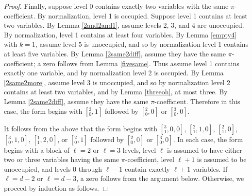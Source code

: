 \documentclass[12pt]{amsart}
\begin{document}
\begin{proof}

Finally, suppose level 0 contains exactly two variables with the same $\pi$-coefficient.  By normalization, level 1 is occupied. Suppose level 1 contains at least two variables.  By Lemma \ref{2and2and1}, assume levels 2, 3, and 4 are unoccupied.
By normalization, level 1 contains at least four variables.  By Lemma \ref{empty4} with $k=1$, assume level 5 is unoccupied, and so by normalization level 1 contains at least five variables.  By Lemma \ref{2same2diff}, assume they have the same $\pi$-coefficient; a zero follows from Lemma \ref{fivesame}. Thus assume level 1 contains exactly one variable, and by normalization level 2 is occupied.  By Lemma \ref{2same2more}, assume level 3 is unoccupied, and so by normalization level 2 contains at least two variables, and by Lemma \ref{threeoh}, at most three.  By Lemma \ref{2same2diff}, assume they have the same $\pi$-coefficient.  Therefore in this case, the form begins with $[{}^2_0, 1]$ followed by $[{}^2_0,0]$ or $[{}^3_0,0]$.



It follows from the above that the form begins with $[{}^3_1,0,0]$, $[{}^2_1,1,0]$, $[{}^2_1,0]$, $[{}^3_0,1,0]$, $[{}^1_1,2,0]$, or $[{}^2_0, 1]$ followed by $[{}^2_0, 0]$ or $[{}^3_0, 0]$.  In each case, the form begins with a block of $\ell = 2$ or $\ell = 3$ levels, level $\ell$ is assumed to have either two or three variables having the same $\pi$-coefficient, level $\ell + 1$ is assumed to be unoccupied, and levels 0 through $\ell - 1$ contain exactly $\ell + 1$ variables.  If $\ell = d-2$ or $\ell = d-3$, a zero follows from the argument below.  Otherwise, we proceed by induction as follows.


\end{proof}
\end{document}
